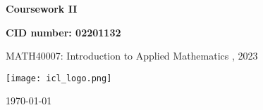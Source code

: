 \documentclass[10pt, a4paper]{article}
\begin{document}
\begin{titlepage}
    \begin{center}
        \vspace*{3cm}
            
        \Huge
        \textbf{
        Coursework II}
            
            
        \vspace{1.5cm}
        \Large
            
        \textbf{
        CID number: 02201132}%
        
            
        \vfill
        
    MATH40007: Introduction to Applied Mathematics , 2023
        \vspace{1cm}
            
        \texttt{[image: icl\_logo.png]}
        \\
        
        \Large
        
        \today
            
    \end{center}
\end{titlepage}
\end{document}

